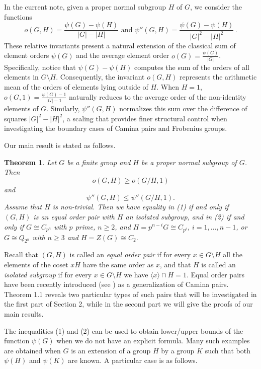 \documentclass[12pt]{article}
\newtheorem{theorem}{Theorem}[section]
\newcommand{\0}{{\leqno}}
\begin{document}
In the current note, given a proper normal subgroup $H$ of $G$, we consider the functions
\begin{equation}
o(G,H)=\frac{\psi(G)-\psi(H)}{|G|-|H|} \mbox{ and } \psi''(G,H)=\frac{\psi(G)-\psi(H)}{|G|^2-|H|^2}\,.\nonumber
\end{equation}These relative invariants present a natural extension of the classical sum of element orders $\psi(G)$ and the average element order $o(G) = \frac{\psi(G)}{|G|}$. Specifically, notice that $\psi(G)-\psi(H)$ computes the sum of the orders of all elements in $G \setminus H$. Consequently, the invariant $o(G,H)$ represents the arithmetic mean of the orders of elements lying outside of $H$. When $H=1$, $o(G,1)=\frac{\psi(G)-1}{|G|-1}$ naturally reduces to the average order of the non-identity elements of $G$. Similarly, $\psi''(G,H)$ normalizes this sum over the difference of squares $|G|^2-|H|^2$, a scaling that provides finer structural control when investigating the boundary cases of Camina pairs and Frobenius groups.

Our main result is stated as follows.

\begin{theorem}
Let $G$ be a finite group and $H$ be a proper normal subgroup of $G$. Then
\begin{equation}
o(G,H)\geq o(G/H,1)
\end{equation}and
\begin{equation}
\psi''(G,H)\leq\psi''(G/H,1).
\end{equation}Assume that $H$ is non-trivial. Then we have equality 
in (1) if and only if $(G,H)$ is an equal order pair with $H$ an isolated subgroup, and in (2) if and only if $G\cong C_{p^n}$ with $p$ prime, $n\geq 2$, and $H=p^{n-i}G\cong C_{p^i}$, $i=1,\dots,n-1$, or $G\cong Q_{2^n}$ with $n\geq 3$ and $H=Z(G)\cong C_2$.
\end{theorem}

Recall that $(G,H)$ is called an \textit{equal order pair} if for every $x\in G\setminus H$ all the elements of the coset $xH$ have
the same order as $x$, and that $H$ is called an \textit{isolated subgroup} if for every $x\in G\setminus H$ we have $\langle x\rangle\cap H=1$. Equal order pairs have been recently introduced (see \cite{7}) as a generalization of Camina pairs. Theorem 1.1 reveals two particular types of such pairs that will be investigated in the first part of Section 2, while in the second part we will give the proofs of our main results.\newpage

The inequalities (1) and (2) can be used to obtain lower/upper bounds of the function $\psi(G)$ when we do not have an explicit formula. Many such examples are obtained when $G$ is an extension of a group $H$ by a group $K$ such that both $\psi(H)$ and $\psi(K)$ are known. A particular case is as follows.
\end{document}
